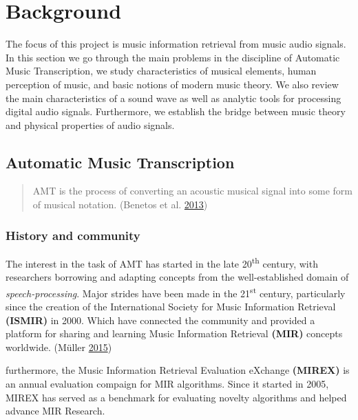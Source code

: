\documentclass[american,]{article}
\begin{document}
\pagebreak

\hypertarget{background}{%
\section{Background}\label{background}}

The focus of this project is music information retrieval
from music audio signals.
In this section we go through the main problems in
the discipline of Automatic Music Transcription,
we study characteristics of musical elements,
human perception of music, and basic notions
of modern music theory.
We also review the main characteristics of a sound wave
as well as analytic tools for processing digital audio signals.
Furthermore, we establish the bridge between music
theory and physical properties of audio signals.

\hypertarget{automatic-music-transcription}{%
\subsection{Automatic Music Transcription}\label{automatic-music-transcription}}

\begin{quote}
AMT is the process of converting an acoustic musical
signal into some form of musical notation. (Benetos et al. \protect\hyperlink{ref-benetos_2013}{2013})
\end{quote}

\hypertarget{history-and-community}{%
\subsubsection{History and community}\label{history-and-community}}

The interest in the task of AMT has started in the late
20\textsuperscript{th} century, with researchers borrowing and adapting
concepts from the well-established domain of
\emph{speech-processing}.
Major strides have been made in the 21\textsuperscript{st} century,
particularly since the creation of the International
Society for Music Information Retrieval \textbf{(ISMIR)} in 2000.
Which have connected the community and provided a platform
for sharing and learning Music Information Retrieval \textbf{(MIR)}
concepts worldwide. (Müller \protect\hyperlink{ref-muller_2015}{2015})

furthermore, the Music Information Retrieval Evaluation eXchange
\textbf{(MIREX)} is an annual evaluation compaign for MIR algorithms.
Since it started in 2005, MIREX has served as a benchmark
for evaluating novelty algorithms and helped advance
MIR Research.
\end{document}
